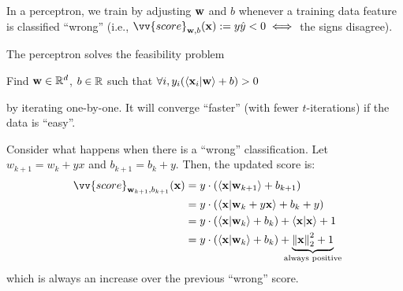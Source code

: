 \documentclass[class=cs480,notes,tikz]{agony}
\begin{document}
In a perceptron, we train by adjusting $\vb w$ and $b$
whenever a training data feature is classified ``wrong''
(i.e., $\vv{score}_{\vb w,b}(\vb x) := y\hat y < 0 \iff$ the signs disagree).

The perceptron solves the feasibility problem
\begin{center}
  Find $\vb w \in \mathbb{R}^d$, $b \in \mathbb{R}$ such that $\forall i, y_i(\ip{\vb x_i}{\vb w} + b) > 0$
\end{center}
by iterating one-by-one.
It will converge ``faster'' (with fewer $t$-iterations) if the data is ``easy''.

Consider what happens when there is a ``wrong'' classification.
Let $w_{k+1} = w_k + yx$ and $b_{k+1} = b_k + y$.
Then, the updated score is:
\begin{align*}
  \vv{score}_{\vb w_{k+1},b_{k+1}}(\vb x)
   & = y \cdot (\ip{\vb x}{\vb w_{k+1}} + b_{k+1})                                                                 \\
   & = y \cdot (\ip{\vb x}{\vb w_k + y\vb x} + b_k + y)                                                            \\
   & = y \cdot (\ip{\vb x}{\vb w_k} + b_k) + \ip{\vb x}{\vb x} + 1                                                 \\
   & = y \cdot (\ip{\vb x}{\vb w_k} + b_k) + \underbrace{\norm{\vb x}_2^2 + 1}_{\mathclap{\text{always positive}}}
\end{align*}
which is always an increase over the previous ``wrong'' score.
\end{document}
